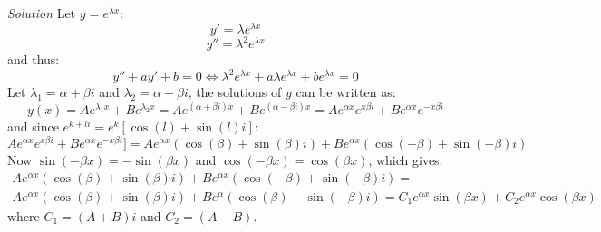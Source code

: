 \begin{example}
\noindent\emph{Solution} Let $y = e^{\lambda x}$:
\[
  y' = \lambda e^{\lambda x}
\]
\[
  y'' = \lambda^2 e^{\lambda x}
\]
and thus:
\[
  y'' + a y' + b = 0 \Leftrightarrow \lambda^2 e^{\lambda x} + a \lambda
  e^{\lambda x} + b e^{\lambda x} = 0
\]
Let $\lambda_1 = \alpha + \beta i$ and $\lambda_2 = \alpha - \beta i$, the
solutions of $y$ can be written as:
\[
  y(x) = A e^{\lambda_1 x} + B e^{\lambda_2 x} = A e^{(\alpha + \beta i) x} + B
  e^{(\alpha - \beta i) x} = A e^{\alpha x} e^{x \beta i} + B e^{\alpha x} e^{- x
  \beta i}
\]
and since $e^{k + l i} = e^{k} [ \cos(l) + \sin(l) i ]$:
\[
  A e^{\alpha x} e^{x \beta i} + B e^{\alpha x} e^{- x \beta i} ] = A e^{\alpha x}
  (\cos(\beta) + \sin(\beta) i) + B e^{\alpha x}  (\cos(- \beta) + \sin(- \beta) i) 
\]
Now $\sin(-\beta x) = -\sin(\beta x)$ and $\cos(-\beta x) = \cos(\beta x)$,
which gives:
\begin{multline*}
  A e^{\alpha x} (\cos(\beta) + \sin(\beta) i) + B e^{\alpha x} (\cos(- \beta)
  + \sin(- \beta) i) = \\ A e^{\alpha x} (\cos(\beta) + \sin(\beta) i) + B
  e^{\alpha} (\cos(\beta) - \sin(- \beta) i) = C_1 e^{\alpha x} \sin (\beta x) +
  C_2 e^{\alpha x} \cos(\beta x)
\end{multline*} 
where $C_1 = (A + B) i$ and $C_2 = (A - B)$.
\end{example}
